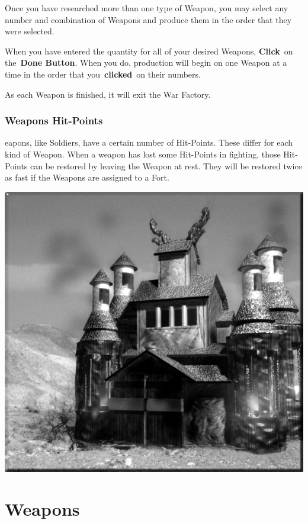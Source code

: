 Once you have researched more than one type of Weapon, you may select any number and combination of Weapons and produce them in the order that they were selected.

When you have entered the quantity for all of your desired Weapons, \textbf{Click} on the \textbf{Done Button}. When you do, production will begin on one Weapon at a time in the order that you \textbf{clicked} on their numbers.

As each Weapon is finished, it will exit the War Factory.

\subsubsection{Weapons Hit-Points}


eapons, like Soldiers, have a certain number of Hit-Points. These differ for each kind of Weapon. When a weapon has lost some Hit-Points in fighting, those Hit-Points can be restored by leaving the Weapon at rest. They will be restored twice as fast if the Weapons are assigned to a Fort.

\begin{center}
	\includegraphics[width=0.9\linewidth]{Awarfactory}
\end{center}

\section{Weapons}

